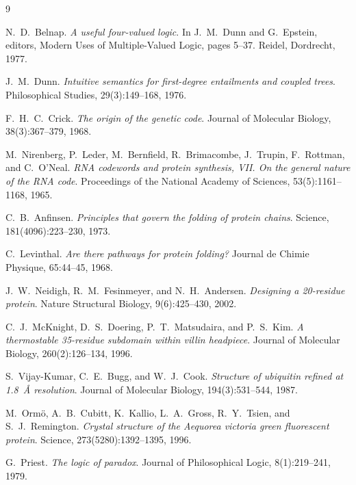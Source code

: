 \documentclass[12pt,a4paper]{article}
\begin{document}
\begin{thebibliography}{9}

 N.~D.~Belnap.
\emph{A useful four-valued logic}. In J.~M.~Dunn and G.~Epstein, editors, Modern
Uses of Multiple-Valued Logic, pages 5--37. Reidel, Dordrecht, 1977.

 J.~M.~Dunn.
\emph{Intuitive semantics for first-degree entailments and coupled trees}.
Philosophical Studies, 29(3):149--168, 1976.

 F.~H.~C.~Crick.
\emph{The origin of the genetic code}. Journal of Molecular Biology,
38(3):367--379, 1968.

 M.~Nirenberg, P.~Leder, M.~Bernfield, R.~Brimacombe,
J.~Trupin, F.~Rottman, and C.~O'Neal.
\emph{RNA codewords and protein synthesis, VII. On the general nature of the RNA
code}. Proceedings of the National Academy of Sciences, 53(5):1161--1168, 1965.

 C.~B.~Anfinsen.
\emph{Principles that govern the folding of protein chains}. Science,
181(4096):223--230, 1973.

 C.~Levinthal.
\emph{Are there pathways for protein folding?} Journal de Chimie Physique,
65:44--45, 1968.

 J.~W.~Neidigh, R.~M.~Fesinmeyer, and N.~H.~Andersen.
\emph{Designing a 20-residue protein}. Nature Structural Biology, 9(6):425--430,
2002.

 C.~J.~McKnight, D.~S.~Doering, P.~T.~Matsudaira, and
P.~S.~Kim.
\emph{A thermostable 35-residue subdomain within villin headpiece}. Journal of
Molecular Biology, 260(2):126--134, 1996.

 S.~Vijay-Kumar, C.~E.~Bugg, and W.~J.~Cook.
\emph{Structure of ubiquitin refined at 1.8~\AA{} resolution}. Journal of Molecular
Biology, 194(3):531--544, 1987.

 M.~Orm\"o, A.~B.~Cubitt, K.~Kallio, L.~A.~Gross, R.~Y.~Tsien,
and S.~J.~Remington.
\emph{Crystal structure of the Aequorea victoria green fluorescent protein}.
Science, 273(5280):1392--1395, 1996.

 G.~Priest.
\emph{The logic of paradox}. Journal of Philosophical Logic, 8(1):219--241, 1979.

\end{thebibliography}
\end{document}
